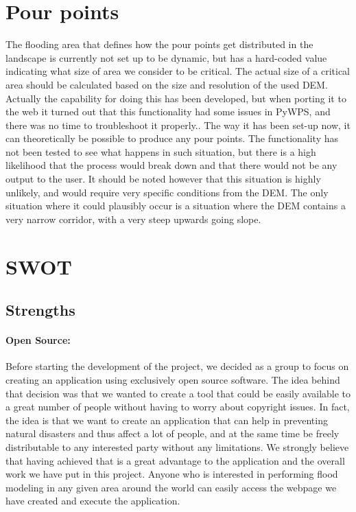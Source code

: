\section{Pour points}
The flooding area that defines how the pour points get distributed in the landscape is currently not set up to be dynamic, but has a hard-coded value indicating what size of area we consider to be critical. The actual size of a critical area should be calculated based on the size and resolution of the used DEM. Actually the capability for doing this has been developed, but when porting it to the web it turned out that this functionality had some issues in PyWPS, and there was no time to troubleshoot it properly..
The way it has been set-up now, it can theoretically be possible to produce any pour points. The functionality has not been tested to see what happens in such situation, but there is a high likelihood that the process would break down and that there would not be any output to the user. It should be noted however that this situation is highly unlikely, and would require very specific conditions from the DEM. The only situation where it could plausibly occur is a situation where the DEM contains a very narrow corridor, with a very steep upwards going slope.

\section{SWOT}
\subsection{Strengths}
\paragraph{Open Source:} Before starting the development of the project, we decided as  a group to focus on creating an application using exclusively open source software. The idea behind that decision was that we wanted to create a tool that could be easily available to a great number of people without having to worry about copyright issues. In fact, the idea is that we want to create an application that can help in preventing natural disasters and thus affect a lot of people, and at the same time be freely distributable to any interested party without any limitations. We strongly believe that having achieved that is a great advantage to the application and the overall work we have put in this project. Anyone who is interested in performing flood modeling in any given area around the world can easily access the webpage we have created and execute the application.

